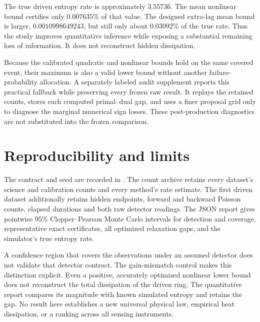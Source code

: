 The true driven entropy rate is approximately $3.55736$. The mean nonlinear
bound certifies only $0.007635\%$ of that value. The designed extra-lag mean
bound is larger, $0.0010998649243$, but still only about $0.03092\%$ of the
true rate. Thus the study improves quantitative inference while exposing a
substantial remaining loss of information. It does not reconstruct hidden
dissipation.

Because the calibrated quadratic and nonlinear bounds hold on the same
covered event, their maximum is also a valid lower bound without another
failure-probability allocation. A separately labeled audit supplement reports
this practical fallback while preserving every frozen raw result. It replays
the retained counts, stores each computed primal--dual gap, and uses a finer
proposal grid only to diagnose the marginal numerical sign losses. These
post-production diagnostics are not substituted into the frozen comparison.

\section{Reproducibility and limits}
The contract and seed are recorded in
. The count archive retains every
dataset's science and calibration counts and every method's rate estimate.
The first driven dataset additionally retains hidden endpoints, forward and
backward Poisson counts, elapsed durations and both raw detector readings.
The JSON report gives pointwise $95\%$ Clopper--Pearson Monte Carlo intervals
for detection and coverage, representative exact certificates, all optimized
relaxation gaps, and the simulator's true entropy rate.

A confidence region that covers the observations under an assumed detector
does not validate that detector contract. The gain-mismatch control makes this
distinction explicit. Even a positive, accurately optimized nonlinear lower
bound does not reconstruct the total dissipation of the driven ring. The
quantitative report compares its magnitude with known simulated entropy and
retains the gap. No result here establishes a new universal physical law,
empirical heat dissipation, or a ranking across all sensing instruments.
